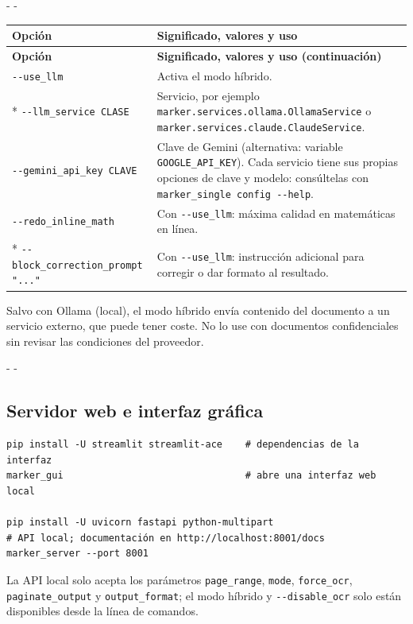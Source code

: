 \documentclass[11pt,a4paper]{article}
\makeatletter
\newcommand{\necesitaespacio}[1]{\par\penalty-100\begingroup
	\setlength{\dimen@}{#1}\dimen@ii\pagegoal\advance\dimen@ii-\pagetotal
	\ifdim\dimen@>\dimen@ii\ifdim\dimen@ii>\z@\vfil\fi\penalty-\@M\fi\endgroup}
\newenvironment{opciones}[1][Opción]{%
	\par\begingroup\small
	\begin{longtable}{L{4.25cm}L{11.2cm}}
		\toprule\rowcolor{tablacab}\cab{#1} & \cab{Significado, valores y uso} \\ \midrule
		\endfirsthead
		\toprule\rowcolor{tablacab}\cab{#1} & \cab{Significado, valores y uso (continuación)} \\ \midrule
		\endhead
		\bottomrule
		\endfoot}
	{\end{longtable}\endgroup}
\newcommand{\cmd}[1]{\texttt{\textcolor{colcmd}{#1}}}      %
\newcommand{\opt}[1]{\texttt{\textcolor{colopt}{#1}}}      %
\newcommand{\val}[1]{\texttt{#1}}                          %
\newcommand{\cab}[1]{\textbf{#1}}
\makeatother
\begin{document}
	\necesitaespacio{16\baselineskip}
	\begin{opciones}
		\opt{-{}-use\_llm} & Activa el modo híbrido.\\*
		\opt{-{}-llm\_\allowbreak{}service CLASE} & Servicio, por ejemplo \val{marker.services.ollama.OllamaService} o \val{marker.services.claude.ClaudeService}.\\
		\opt{-{}-gemini\_\allowbreak{}api\_\allowbreak{}key CLAVE} & Clave de Gemini (alternativa: variable \texttt{GOOGLE\_\allowbreak{}API\_\allowbreak{}KEY}). Cada servicio tiene sus propias opciones de clave y modelo: consúltelas con \cmd{marker\_\allowbreak{}single config -{}-help}.\\
		\opt{-{}-redo\_\allowbreak{}inline\_\allowbreak{}math} & Con \opt{-{}-use\_llm}: máxima calidad en matemáticas en línea.\\*
		\opt{-{}-block\_\allowbreak{}correction\_\allowbreak{}prompt "..."} & Con \opt{-{}-use\_llm}: instrucción adicional para corregir o dar formato al resultado.\\
	\end{opciones}
	
	\begin{advertencia}
		Salvo con Ollama (local), el modo híbrido envía contenido del documento a un servicio externo, que puede tener coste. No lo use con documentos confidenciales sin revisar las condiciones del proveedor.
	\end{advertencia}
	
	\necesitaespacio{8\baselineskip}
	\subsection{Servidor web e interfaz gráfica}
	
	\begin{lstlisting}
pip install -U streamlit streamlit-ace    # dependencias de la interfaz
marker_gui                                # abre una interfaz web local

pip install -U uvicorn fastapi python-multipart
# API local; documentación en http://localhost:8001/docs
marker_server --port 8001
\end{lstlisting}
	
	La API local solo acepta los parámetros \texttt{page\_range}, \texttt{mode}, \texttt{force\_ocr}, \texttt{paginate\_\allowbreak{}output} y \texttt{output\_format}; el modo híbrido y \opt{-{}-disable\_ocr} solo están disponibles desde la línea de comandos.
	
\end{document}
